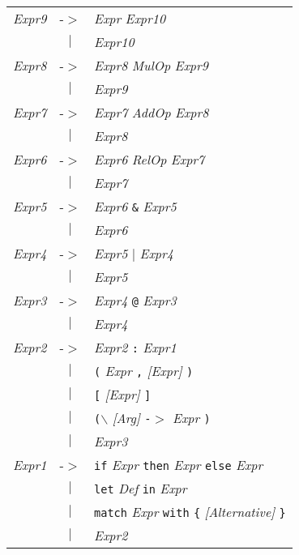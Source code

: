 \documentclass{article}
\begin{document}
\begin{center}
\begin{tabular}{lll}
\textit{Expr9} & -$>$ & \textit{Expr} \textit{Expr10} \\
 & \multicolumn{1}{c}{\textbf{$|$}} & \textit{Expr10} \\
\textit{Expr8} & -$>$ & \textit{Expr8} \textit{MulOp} \textit{Expr9} \\
 & \multicolumn{1}{c}{\textbf{$|$}} & \textit{Expr9} \\
\textit{Expr7} & -$>$ & \textit{Expr7} \textit{AddOp} \textit{Expr8} \\
 & \multicolumn{1}{c}{\textbf{$|$}} & \textit{Expr8} \\
\textit{Expr6} & -$>$ & \textit{Expr6} \textit{RelOp} \textit{Expr7} \\
 & \multicolumn{1}{c}{\textbf{$|$}} & \textit{Expr7} \\
\textit{Expr5} & -$>$ & \textit{Expr6} \texttt{\&} \textit{Expr5} \\
 & \multicolumn{1}{c}{\textbf{$|$}} & \textit{Expr6} \\
\textit{Expr4} & -$>$ & \textit{Expr5} \texttt{$|$} \textit{Expr4} \\
 & \multicolumn{1}{c}{\textbf{$|$}} & \textit{Expr5} \\
\textit{Expr3} & -$>$ & \textit{Expr4} \texttt{@} \textit{Expr3} \\
 & \multicolumn{1}{c}{\textbf{$|$}} & \textit{Expr4} \\
\textit{Expr2} & -$>$ & \textit{Expr2} \texttt{:} \textit{Expr1} \\
 & \multicolumn{1}{c}{\textbf{$|$}} & \texttt{(} \textit{Expr} \texttt{,} \textit{[Expr]} \texttt{)} \\
 & \multicolumn{1}{c}{\textbf{$|$}} & \texttt{[} \textit{[Expr]} \texttt{]} \\
 & \multicolumn{1}{c}{\textbf{$|$}} & \texttt{($\backslash$} \textit{[Arg]} \texttt{-$>$} \textit{Expr} \texttt{)} \\
 & \multicolumn{1}{c}{\textbf{$|$}} & \textit{Expr3} \\
\textit{Expr1} & -$>$ & \texttt{if} \textit{Expr} \texttt{then} \textit{Expr} \texttt{else} \textit{Expr} \\
 & \multicolumn{1}{c}{\textbf{$|$}} & \texttt{let} \textit{Def} \texttt{in} \textit{Expr} \\
 & \multicolumn{1}{c}{\textbf{$|$}} & \texttt{match} \textit{Expr} \texttt{with} \texttt{\{} \textit{[Alternative]} \texttt{\}} \\
 & \multicolumn{1}{c}{\textbf{$|$}} & \textit{Expr2} \\

\end{tabular}
\end{center}
\end{document}
